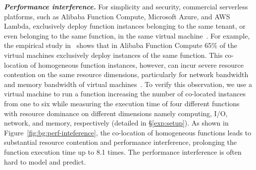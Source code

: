 \textbf{\textit{Performance interference.}}
For simplicity and security, commercial serverless platforms, such as Alibaba Function Compute, Microsoft Azure, and AWS Lambda, exclusively deploy function instances belonging to the same tenant, or even belonging to the same function, in the same virtual machine~\cite{socc22-owl,atc18-peek-bench}.
For example, the empirical study in~\cite{socc22-owl} shows that in Alibaba Function Compute 65\% of the virtual machines exclusively deploy instances of the same function.
This co-location of homogeneous function instances, however, can incur severe resource contention on the same resource dimensions, particularly for network bandwidth and memory bandwidth of virtual machines~\cite{sc21-gsight,micro19-faaSprofiler,socc22-owl,atc18-peek-bench}.
To verify this observation, we use a virtual machine to run a function increasing the number of co-located instances from one to six while measuring the execution time of four different functions with resource dominance on different dimensions namely computing, I/O, network, and memory, respectively (detailed in \S\ref{exp:setup}). 
As shown in Figure~\ref{fig:bg:perf-inteference}, the co-location of homogeneous functions leads to substantial resource contention and performance interference, prolonging the function execution time up to 8.1 times. The performance interference is often hard to model and predict.




